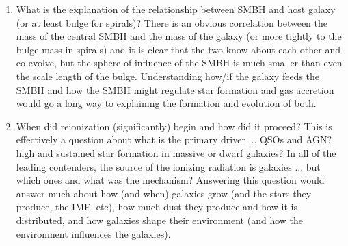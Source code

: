 \documentclass[11pt]{article}
\begin{document}
\begin{enumerate}
\begin{enumerate}
\begin{enumerate}
	  \item What is the explanation of the relationship between SMBH and host galaxy (or at least bulge for spirals)? There is an obvious correlation between the mass of the central SMBH and the mass of the galaxy (or more tightly to the bulge mass in spirals) and it is clear that the two know about each other and co-evolve, but the sphere of influence of the SMBH is much smaller than even the scale length of the bulge. Understanding how/if the galaxy feeds the SMBH and how the SMBH might regulate star formation and gas accretion would go a long way to explaining the formation and evolution of both.\\
	  
	  \item When did reionization (significantly) begin and how did it proceed? This is effectively a question about what is the primary driver ... QSOs and AGN? high and sustained star formation in massive or dwarf galaxies? In all of the leading contenders, the source of the ionizing radiation is galaxies ... but which ones and what was the mechanism? Answering this question would answer much about how (and when) galaxies grow (and the stars they produce, the IMF, etc), how much dust they produce and how it is distributed, and how galaxies shape their environment (and how the environment influences the galaxies). 
	  
	  \end{enumerate}
  
  
  \end{enumerate}

\end{enumerate}
\end{document}
